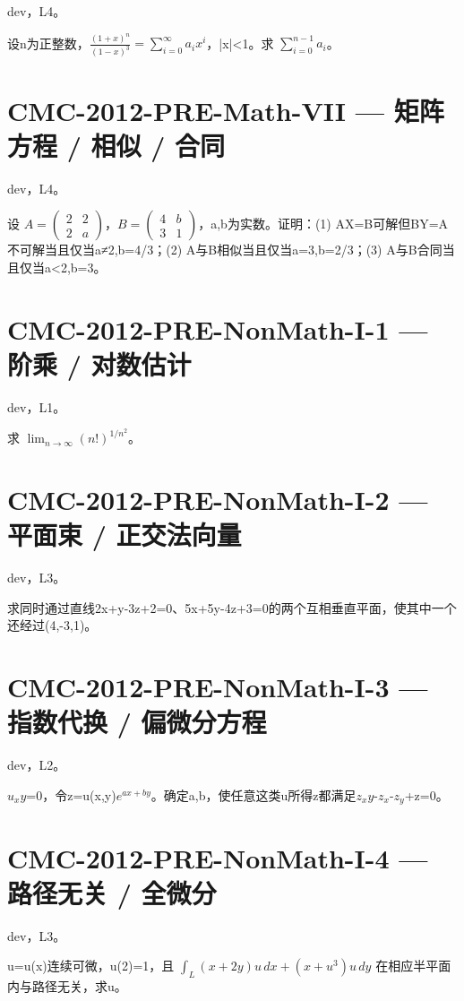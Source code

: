 \documentclass[UTF8]{ctexart}
\begin{document}
dev，L4。

设n为正整数，$\frac{(1+x)^n}{(1-x)^3}=\sum_{i=0}^\infty a_i x^i$，|x|<1。求 $\sum_{i=0}^{n-1}a_i$。

\section*{CMC-2012-PRE-Math-VII — 矩阵方程 / 相似 / 合同}

dev，L4。

设 $A=\begin{pmatrix}2&2\\2&a\end{pmatrix}$，$B=\begin{pmatrix}4&b\\3&1\end{pmatrix}$，a,b为实数。证明：(1) AX=B可解但BY=A不可解当且仅当a≠2,b=4/3；(2) A与B相似当且仅当a=3,b=2/3；(3) A与B合同当且仅当a<2,b=3。

\section*{CMC-2012-PRE-NonMath-I-1 — 阶乘 / 对数估计}

dev，L1。

求 $\lim_{n\to\infty}(n!)^{1/n^2}$。

\section*{CMC-2012-PRE-NonMath-I-2 — 平面束 / 正交法向量}

dev，L3。

求同时通过直线2x+y-3z+2=0、5x+5y-4z+3=0的两个互相垂直平面，使其中一个还经过(4,-3,1)。

\section*{CMC-2012-PRE-NonMath-I-3 — 指数代换 / 偏微分方程}

dev，L2。

$u_xy$=0，令z=u(x,y)$e^{ax+by}$。确定a,b，使任意这类u所得z都满足$z_xy$-$z_x$-$z_y$+z=0。

\section*{CMC-2012-PRE-NonMath-I-4 — 路径无关 / 全微分}

dev，L3。

u=u(x)连续可微，u(2)=1，且 $\int_L(x+2y)u\,dx+(x+u^3)u\,dy$ 在相应半平面内与路径无关，求u。
\end{document}
